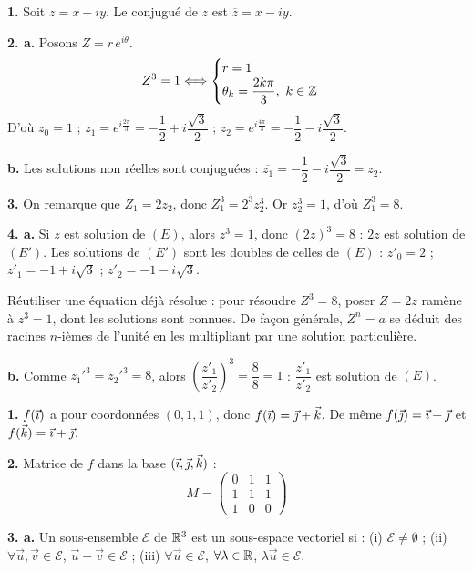 \documentclass[11pt]{article}
\begin{document}

\textbf{1.} Soit $z = x + iy$. Le conjugué de $z$ est $\overline{z} = x - iy$.

\textbf{2. a.} Posons $Z = r\,e^{i\theta}$.
\[ Z^3 = 1 \Longleftrightarrow \begin{cases} r = 1 \\ \theta_k = \dfrac{2k\pi}{3},\ k \in \mathbb{Z} \end{cases} \]
D'où $z_0 = 1$ ; \quad $z_1 = e^{i\frac{2\pi}{3}} = -\dfrac{1}{2} + i\dfrac{\sqrt{3}}{2}$ ; \quad $z_2 = e^{i\frac{4\pi}{3}} = -\dfrac{1}{2} - i\dfrac{\sqrt{3}}{2}$.

\textbf{b.} Les solutions non réelles sont conjuguées : $\overline{z_1} = -\dfrac{1}{2} - i\dfrac{\sqrt{3}}{2} = z_2$.

\textbf{3.} On remarque que $Z_1 = 2z_2$, donc $Z_1^3 = 2^3 z_2^3$. Or $z_2^3 = 1$, d'où $Z_1^3 = 8$.

\textbf{4. a.} Si $z$ est solution de $(E)$, alors $z^3 = 1$, donc $(2z)^3 = 8$ : $2z$ est solution de $(E')$. Les solutions de $(E')$ sont les doubles de celles de $(E)$ : $z'_0 = 2$ ; $z'_1 = -1 + i\sqrt{3}$ ; $z'_2 = -1 - i\sqrt{3}$.

\begin{methode}
Réutiliser une équation déjà résolue : pour résoudre $Z^3 = 8$, poser
$Z = 2z$ ramène à $z^3 = 1$, dont les solutions sont connues. De façon
générale, $Z^n = a$ se déduit des racines $n$-ièmes de l'unité en les
multipliant par une solution particulière.
\end{methode}

\textbf{b.} Comme $z_1'^3 = z_2'^3 = 8$, alors $\left(\dfrac{z'_1}{z'_2}\right)^3 = \dfrac{8}{8} = 1$ : $\dfrac{z'_1}{z'_2}$ est solution de $(E)$.

\textbf{1.} $f(\vec{\imath})$ a pour coordonnées $(0, 1, 1)$, donc $f(\vec{\imath}) = \vec{\jmath} + \vec{k}$. De même $f(\vec{\jmath}) = \vec{\imath} + \vec{\jmath}$ et $f(\vec{k}) = \vec{\imath} + \vec{\jmath}$.

\textbf{2.} Matrice de $f$ dans la base $(\vec{\imath}, \vec{\jmath}, \vec{k})$ :
\[ M = \begin{pmatrix} 0 & 1 & 1 \\ 1 & 1 & 1 \\ 1 & 0 & 0 \end{pmatrix} \]

\textbf{3. a.} Un sous-ensemble $\mathscr{E}$ de $\mathbb{R}^3$ est un sous-espace vectoriel si : (i) $\mathscr{E} \ne \emptyset$ ; (ii) $\forall \vec{u}, \vec{v} \in \mathscr{E}$, $\vec{u} + \vec{v} \in \mathscr{E}$ ; (iii) $\forall \vec{u} \in \mathscr{E}$, $\forall \lambda \in \mathbb{R}$, $\lambda\vec{u} \in \mathscr{E}$.
\end{document}
